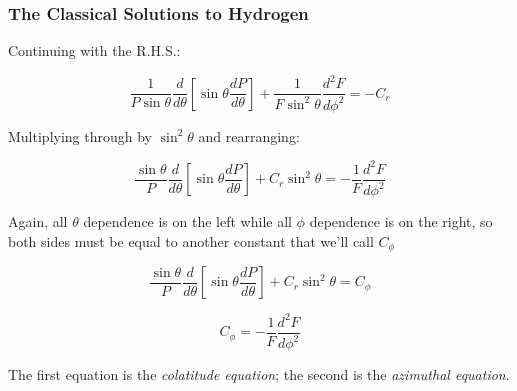 \documentclass{beamer}
\begin{document}
\begin{frame}
\frametitle{The Classical Solutions to Hydrogen}
Continuing with the R.H.S.:

\begin{equation*}
\frac{1}{P\sin\theta} \frac{d}{d\theta}\left[\sin\theta\frac{dP}{d\theta}\right]+\frac{1}{F\sin^2\theta}\frac{d^2 F}{d\phi^2} = - C_r
\end{equation*}

Multiplying through by $\sin^2\theta$ and rearranging:

\begin{equation*}
\frac{\sin\theta}{P} \frac{d}{d\theta}\left[\sin\theta\frac{dP}{d\theta}\right] + C_r \sin^2\theta = - \frac{1}{F}\frac{d^2 F}{d\phi^2}
\end{equation*}

Again, all $\theta$ dependence is on the left while all $\phi$ dependence is on the right, so both sides
must be equal to another constant that we'll call $C_\phi$

\begin{equation*}
\frac{\sin\theta}{P} \frac{d}{d\theta}\left[\sin\theta\frac{dP}{d\theta}\right] + C_r \sin^2\theta = C_\phi
\end{equation*}

\begin{equation*}
C_\phi = - \frac{1}{F}\frac{d^2 F}{d\phi^2}
\end{equation*}

The first equation is the {\it colatitude equation}; the second is the {\it azimuthal equation}.
\end{frame}
\end{document}
